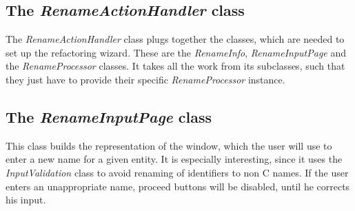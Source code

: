 \documentclass[a4paper,10pt]{report}
\begin{document}
\subsection{The {\it RenameActionHandler} class}
The {\it RenameActionHandler} class plugs together the classes, which are needed to set up the refactoring wizard.
These are the {\it RenameInfo}, {\it RenameInputPage} and the {\it RenameProcessor} classes.
It takes all the work from its subclasses, such that they just have to provide their specific {\it RenameProcessor} instance.

\subsection{The {\it RenameInputPage} class}
This class builds the representation of the window, which the user will use to enter a new name for a given entity.
It is especially interesting, since it uses the {\it InputValidation} class to avoid renaming of identifiers to non C names.
If the user enters an unappropriate name, proceed buttons will be disabled, until he corrects his input.
\end{document}
